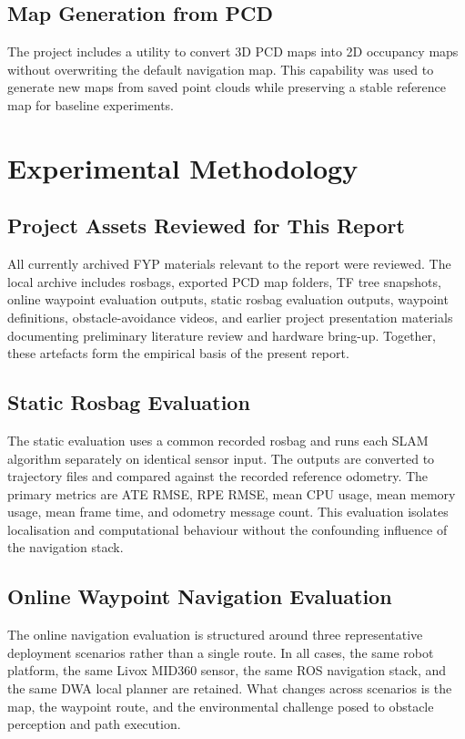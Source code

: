\documentclass[12pt,a4paper]{report}
\begin{document}
\section{Map Generation from PCD}
The project includes a utility to convert 3D PCD maps into 2D occupancy maps without overwriting the default navigation map. This capability was used to generate new maps from saved point clouds while preserving a stable reference map for baseline experiments.

\chapter{Experimental Methodology}

\section{Project Assets Reviewed for This Report}
All currently archived FYP materials relevant to the report were reviewed. The local archive includes rosbags, exported PCD map folders, TF tree snapshots, online waypoint evaluation outputs, static rosbag evaluation outputs, waypoint definitions, obstacle-avoidance videos, and earlier project presentation materials documenting preliminary literature review and hardware bring-up. Together, these artefacts form the empirical basis of the present report.

\section{Static Rosbag Evaluation}
The static evaluation uses a common recorded rosbag and runs each SLAM algorithm separately on identical sensor input. The outputs are converted to trajectory files and compared against the recorded reference odometry. The primary metrics are ATE RMSE, RPE RMSE, mean CPU usage, mean memory usage, mean frame time, and odometry message count. This evaluation isolates localisation and computational behaviour without the confounding influence of the navigation stack.

\section{Online Waypoint Navigation Evaluation}
The online navigation evaluation is structured around three representative deployment scenarios rather than a single route. In all cases, the same robot platform, the same Livox MID360 sensor, the same ROS navigation stack, and the same DWA local planner are retained. What changes across scenarios is the map, the waypoint route, and the environmental challenge posed to obstacle perception and path execution.
\end{document}
